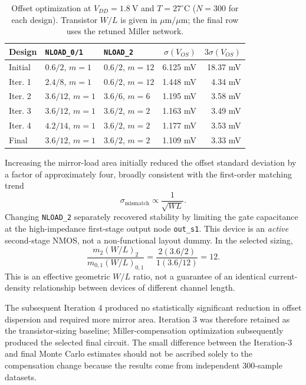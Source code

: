 \begin{table}[ht]
    \centering
    \caption{Offset optimization at $V_{DD}=1.8~\mathrm{V}$ and
    $T=27^\circ\mathrm{C}$ ($N=300$ for each design). Transistor
    $W/L$ is given in $\mu\mathrm{m}/\mu\mathrm{m}$; the final row
    uses the retuned Miller network.}
    \label{tab:mc_sizing_iterations}
    \small
    \begin{tabular}{lllrr}
        \hline
        Design & \texttt{NLOAD\_0/1} & \texttt{NLOAD\_2}
        & $\sigma(V_{OS})$ & $3\sigma(V_{OS})$ \\
        \hline
        Initial & $0.6/2$, $m=1$ & $0.6/2$, $m=12$
        & 6.125 mV & 18.37 mV \\
        Iter. 1 & $2.4/8$, $m=1$ & $0.6/2$, $m=12$
        & 1.448 mV & 4.34 mV \\
        Iter. 2 & $3.6/12$, $m=1$ & $3.6/6$, $m=6$
        & 1.195 mV & 3.58 mV \\
        Iter. 3 & $3.6/12$, $m=1$ & $3.6/2$, $m=2$
        & 1.163 mV & 3.49 mV \\
        Iter. 4 & $4.2/14$, $m=1$ & $3.6/2$, $m=2$
        & 1.177 mV & 3.53 mV \\
        Final & $3.6/12$, $m=1$ & $3.6/2$, $m=2$
        & 1.109 mV & 3.33 mV \\
        \hline
    \end{tabular}
\end{table}

Increasing the mirror-load area initially reduced the offset
standard deviation by a factor of approximately four, broadly
consistent with the first-order matching trend
\[
\sigma_{\mathrm{mismatch}}\propto\frac{1}{\sqrt{WL}}.
\]
Changing \texttt{NLOAD\_2} separately recovered stability by limiting
the gate capacitance at the high-impedance first-stage output node
\texttt{out\_s1}. This device is an \emph{active} second-stage NMOS,
not a non-functional layout dummy. In the selected sizing,
\[
\frac{m_2(W/L)_2}{m_{0,1}(W/L)_{0,1}}=
\frac{2(3.6/2)}{1(3.6/12)}=12.
\]
This is an effective geometric $W/L$ ratio, not a guarantee of an
identical current-density relationship between devices of different
channel length.

The subsequent Iteration 4 produced no statistically significant
reduction in offset dispersion and required more mirror area.
Iteration 3 was therefore retained as the transistor-sizing baseline;
Miller-compensation optimization subsequently produced the selected
final circuit. The small difference between the Iteration-3 and final
Monte Carlo estimates should not be ascribed solely to the compensation
change because the results come from independent 300-sample datasets.

